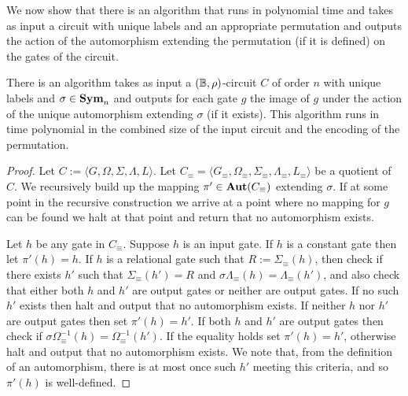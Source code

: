 \documentclass[../main/thesis.tex]{subfiles}
\begin{document}
We now show that there is an algorithm that runs in polynomial time and takes as
input a circuit with unique labels and an appropriate permutation and outputs
the action of the automorphism extending the permutation (if it is defined) on
the gates of the circuit.

\begin{lem}
  There is an algorithm takes as input a $(\mathbb{B}, \rho)$-circuit $C$ of order $n$
  with unique labels and $\sigma \in \text{\textbf{Sym}}_n$ and outputs for each gate $g$ the
  image of $g$ under the action of the unique automorphism extending $\sigma$
  (if it exists). This algorithm runs in time polynomial in the combined size of
  the input circuit and the encoding of the permutation.
  \label{lem:compute-automorphisms}
\end{lem}
\begin{proof}
  Let $C := \langle G, \Omega, \Sigma, \Lambda, L \rangle$. Let $C_\equiv =
  \langle G_\equiv, \Omega_\equiv, \Sigma_\equiv, \Lambda_\equiv, L_\equiv
  \rangle$ be a quotient of $C$. We recursively build up the mapping $\pi' \in
  \text{\textbf{Aut}}(C_\equiv)$ extending $\sigma$. If at some point in the recursive
  construction we arrive at a point where no mapping for $g$ can be found we
  halt at that point and return that no automorphism exists.

  Let $h$ be any gate in $C_\equiv$. Suppose $h$ is an input gate. If $h$ is a
  constant gate then let $\pi' (h) = h$. If $h$ is a relational gate such that
  $R := \Sigma_\equiv(h)$, then check if there exists $h'$ such that
  $\Sigma_\equiv (h') = R$ and $\sigma \Lambda_\equiv(h) = \Lambda_\equiv(h')$,
  and also check that either both $h$ and $h'$ are output gates or neither are
  output gates. If no such $h'$ exists then halt and output that no automorphism
  exists. If neither $h$ nor $h'$ are output gates then set $\pi'(h) = h'$. If
  both $h$ and $h'$ are output gates then check if $\sigma \Omega^{-1}_\equiv(h)
  = \Omega^{-1}_\equiv(h')$. If the equality holds set $\pi'(h) = h'$, otherwise
  halt and output that no automorphism exists. We note that, from the definition
  of an automorphism, there is at most once such $h'$ meeting this criteria, and
  so $\pi'(h)$ is well-defined.


\end{proof}
\end{document}
